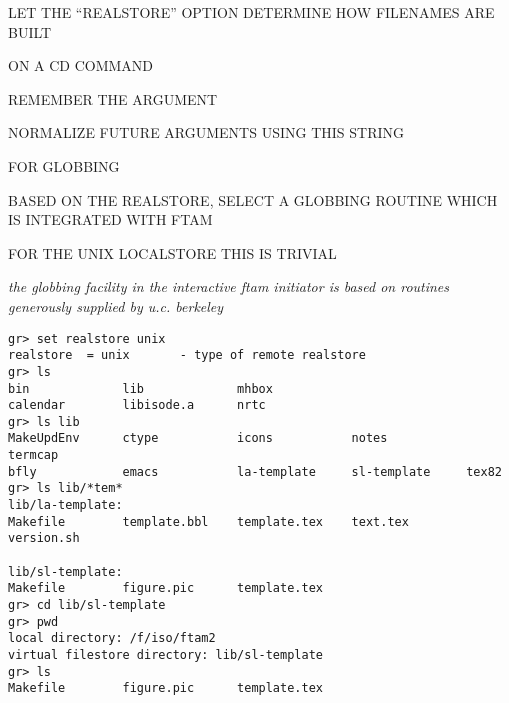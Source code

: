 \begin{bwslide}

\begin{nrtc}
\item	LET THE ``REALSTORE'' OPTION DETERMINE HOW FILENAMES ARE BUILT

\item	ON A CD COMMAND
    \begin{nrtc}
    \item	REMEMBER THE ARGUMENT

    \item	NORMALIZE FUTURE ARGUMENTS USING THIS STRING
    \end{nrtc}

\item	FOR GLOBBING
    \begin{nrtc}
    \item	BASED ON THE REALSTORE, SELECT A GLOBBING ROUTINE WHICH
		IS INTEGRATED WITH FTAM

    \item	FOR THE UNIX LOCALSTORE THIS IS TRIVIAL
    \end{nrtc}
\end{nrtc}
\end{bwslide}


\begin{note}\em
the globbing facility in the interactive ftam initiator is
based on routines generously supplied by u.c. berkeley
\end{note}


\begin{bwslide}
\small

\begin{verbatim}
gr> set realstore unix
realstore  = unix       - type of remote realstore
gr> ls
bin             lib             mhbox
calendar        libisode.a      nrtc
gr> ls lib
MakeUpdEnv      ctype           icons           notes           termcap
bfly            emacs           la-template     sl-template     tex82
gr> ls lib/*tem*
lib/la-template:
Makefile        template.bbl    template.tex    text.tex        version.sh

lib/sl-template:
Makefile        figure.pic      template.tex
gr> cd lib/sl-template
gr> pwd
local directory: /f/iso/ftam2
virtual filestore directory: lib/sl-template
gr> ls
Makefile        figure.pic      template.tex
\end{verbatim}
\end{bwslide}


